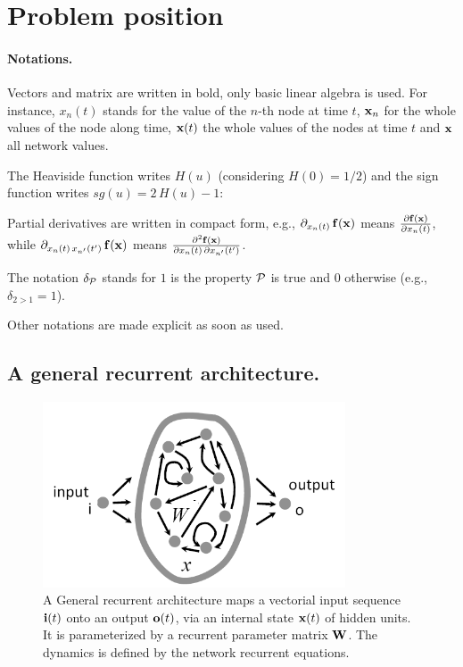 \section{Problem position} \label{position}

\paragraph{Notations.} 

Vectors and matrix are written in bold, only basic linear algebra is used. For instance, $x_n(t)$ stands for the value of the $n$-th node at time $t$, ${\bf x}_n$ for the whole values of the node along time, ${\bf x}(t)$ the whole values of the nodes at time $t$ and ${\bf x}$ all network values.

The Heaviside function writes $H(u)$ (considering $H(0) = 1/2$) and the sign function writes $sg(u) = 2 \, H(u) -1$:

Partial derivatives are written in compact form, e.g., $\partial_{x_n(t)} \, {\bf f}({\bf x})$ means $\frac{\partial {\bf f}({\bf x})}{\partial x_n(t)}$,
while $\partial_{x_n(t)\,x_{n'}(t')} \, {\bf f}({\bf x})$ means $\frac{\partial^2 {\bf f}({\bf x})}{\partial x_n(t) \,\partial x_{n'}(t')}$.

The notation $\delta_{\cal P}$ stands for $1$ is the property ${\cal P}$ is true and $0$ otherwise (e.g., $\delta_{2 > 1} = 1$).

Other notations are made explicit as soon as used.

\subsection*{A general recurrent architecture.}

\begin{figure}[!ht]
  \includegraphics[width=0.8\textwidth]{img/recurrent-network}
  \caption{A General recurrent architecture maps a vectorial input sequence ${\bf i}(t)$ onto an output ${\bf o}(t)$, 
    via an internal state ${\bf x}(t)$ of hidden units. It is parameterized by a recurrent parameter matrix ${\bf W}$. 
    The dynamics is defined by the network recurrent equations.}
  \label{recurrent-network}
\end{figure}

